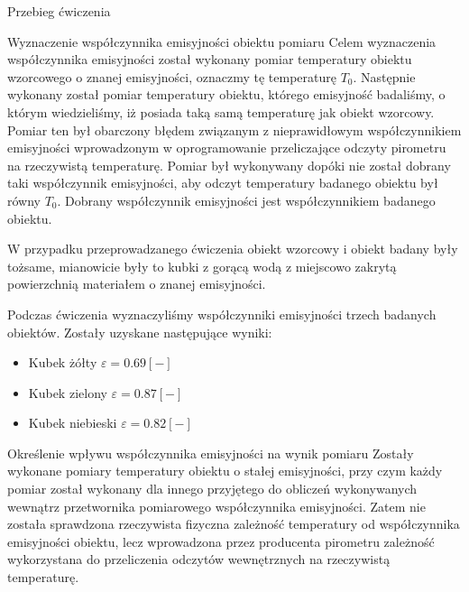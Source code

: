 \documentclass[12pt]{article}
\begin{document}
\begin{section}{Przebieg ćwiczenia}
	\begin{subsection}{Wyznaczenie współczynnika emisyjności obiektu pomiaru}
		Celem wyznaczenia współczynnika emisyjności został wykonany pomiar temperatury
		obiektu wzorcowego o znanej emisyjności, oznaczmy tę temperaturę $T_0$.
		Następnie wykonany został pomiar temperatury obiektu, którego emisyjność badaliśmy, o
		którym wiedzieliśmy, iż posiada taką samą temperaturę jak obiekt wzorcowy.
		Pomiar ten był obarczony błędem związanym z nieprawidłowym współczynnikiem
		emisyjności wprowadzonym w oprogramowanie przeliczające odczyty pirometru na
		rzeczywistą temperaturę. Pomiar był wykonywany dopóki nie został dobrany taki
		współczynnik emisyjności, aby odczyt temperatury badanego obiektu był równy
		$T_0$. Dobrany współczynnik emisyjności jest współczynnikiem badanego obiektu.
		
		W przypadku przeprowadzanego ćwiczenia obiekt wzorcowy i obiekt badany były
		tożsame, mianowicie były to kubki z gorącą wodą z miejscowo zakrytą
		powierzchnią materiałem o znanej emisyjności.
		
		Podczas ćwiczenia wyznaczyliśmy współczynniki emisyjności trzech badanych
		obiektów. Zostały uzyskane następujące wyniki:
		\begin{itemize}
		  \item Kubek żółty $\varepsilon = 0.69[-]$
		  \item Kubek zielony $\varepsilon = 0.87[-]$
		  \item Kubek niebieski $\varepsilon = 0.82[-]$
		\end{itemize}
	\end{subsection}
	
	\newpage
	
	\begin{subsection}{Określenie wpływu współczynnika emisyjności na wynik
	pomiaru}
		Zostały wykonane pomiary temperatury obiektu o stałej emisyjności, przy czym
		każdy pomiar został wykonany dla innego przyjętego do obliczeń wykonywanych
		wewnątrz przetwornika pomiarowego współczynnika emisyjności. Zatem nie została
		sprawdzona rzeczywista fizyczna zależność temperatury od współczynnika
		emisyjności obiektu, lecz wprowadzona przez producenta pirometru
		zależność wykorzystana do przeliczenia odczytów wewnętrznych na rzeczywistą
		temperaturę.
		

\end{subsection}
\end{section}
\end{document}
